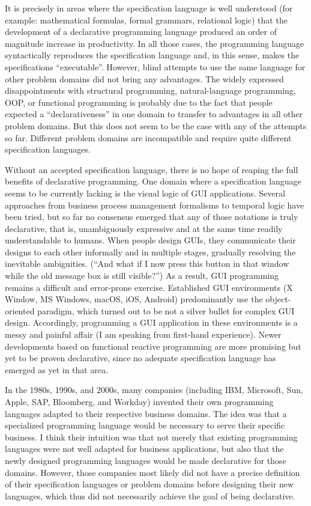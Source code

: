 It is precisely in areas where the specification language is well
understood (for example: mathematical formulas, formal grammars, relational
logic) that the development of a declarative programming language
produced an order of magnitude increase in productivity. In all those
cases, the programming language syntactically reproduces the specification
language and, in this sense, makes the specifications \textsf{``}executable\textsf{''}.
However, blind attempts to use the same language for other problem
domains did not bring any advantages. The widely expressed disappointments
with structural programming, natural-language programming, OOP, or
functional programming is probably due to the fact that people expected
a \textsf{``}declarativeness\textsf{''} in one domain to transfer to advantages in
all other problem domains. But this does not seem to be the case with
any of the attempts so far. Different problem domains are incompatible
and require quite different specification languages.

Without an accepted specification language, there is no hope of reaping
the full benefits of declarative programming. One domain where a specification
language seems to be currently lacking is the visual logic of GUI
applications. Several approaches \textemdash{} from business process
management formalisms to temporal logic \textemdash{} have been tried,
but so far no consensus emerged that any of those notations is truly
declarative, \textemdash{} that is, unambiguously expressive and at
the same time readily understandable to humans. When people design
GUIs, they communicate their designs to each other informally and
in multiple stages, gradually resolving the inevitable ambiguities.
(\textsf{``}And what if I now press this button in that window while the old
message box is still visible?\textsf{''}) As a result, GUI programming remains
a difficult and error-prone exercise. Established GUI environments
(X Window, MS Windows, macOS, iOS, Android) predominantly use the
object-oriented paradigm, which turned out to be not a silver bullet
for complex GUI design. Accordingly, programming a GUI application
in these environments is a messy and painful affair (I am speaking
from first-hand experience). Newer developments based on functional
reactive programming are more promising but yet to be proven declarative,
since no adequate specification language has emerged as yet in that
area. 


In the 1980s, 1990s, and 2000s, many companies (including IBM, Microsoft,
Sun, Apple, SAP, Bloomberg, and Workday) invented their own programming
languages adapted to their respective business domains. The idea was
that a specialized programming language would be necessary to serve
their specific business. I think their intuition was that not merely
that existing programming languages were not well adapted for business
applications, but also that the newly designed programming languages
would be made declarative for those domains. However, those companies
most likely did not have a precise definition of their specification
languages or problem domains before designing their new languages,
which thus did not necessarily achieve the goal of being declarative.

